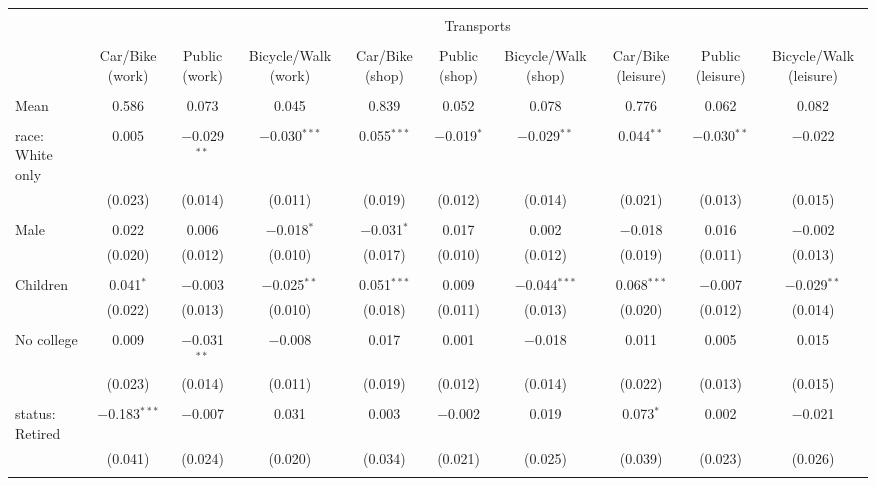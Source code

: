 
\begin{tabular}{@{\extracolsep{5pt}}lccccccccc} 
\\[-1.8ex]\hline 
\hline \\[-1.8ex] 
 & \multicolumn{9}{c}{Transports} \\ 
\cline{2-10} 
\\[-1.8ex] & Car/Bike (work) & Public (work) & Bicycle/Walk (work) & Car/Bike (shop) & Public (shop) & Bicycle/Walk (shop) & Car/Bike (leisure) & Public (leisure) & Bicycle/Walk (leisure) \\ 
\hline \\[-1.8ex] 
 Mean & 0.586 & 0.073 & 0.045 & 0.839 & 0.052 & 0.078 & 0.776 & 0.062 & 0.082  \\ \hline \\[-1.8ex] race: White only & 0.005 & $-$0.029$^{**}$ & $-$0.030$^{***}$ & 0.055$^{***}$ & $-$0.019$^{*}$ & $-$0.029$^{**}$ & 0.044$^{**}$ & $-$0.030$^{**}$ & $-$0.022 \\ 
  & (0.023) & (0.014) & (0.011) & (0.019) & (0.012) & (0.014) & (0.021) & (0.013) & (0.015) \\ 
  & & & & & & & & & \\ 
 Male & 0.022 & 0.006 & $-$0.018$^{*}$ & $-$0.031$^{*}$ & 0.017 & 0.002 & $-$0.018 & 0.016 & $-$0.002 \\ 
  & (0.020) & (0.012) & (0.010) & (0.017) & (0.010) & (0.012) & (0.019) & (0.011) & (0.013) \\ 
  & & & & & & & & & \\ 
 Children & 0.041$^{*}$ & $-$0.003 & $-$0.025$^{**}$ & 0.051$^{***}$ & 0.009 & $-$0.044$^{***}$ & 0.068$^{***}$ & $-$0.007 & $-$0.029$^{**}$ \\ 
  & (0.022) & (0.013) & (0.010) & (0.018) & (0.011) & (0.013) & (0.020) & (0.012) & (0.014) \\ 
  & & & & & & & & & \\ 
 No college & 0.009 & $-$0.031$^{**}$ & $-$0.008 & 0.017 & 0.001 & $-$0.018 & 0.011 & 0.005 & 0.015 \\ 
  & (0.023) & (0.014) & (0.011) & (0.019) & (0.012) & (0.014) & (0.022) & (0.013) & (0.015) \\ 
  & & & & & & & & & \\ 
 status: Retired & $-$0.183$^{***}$ & $-$0.007 & 0.031 & 0.003 & $-$0.002 & 0.019 & 0.073$^{*}$ & 0.002 & $-$0.021 \\ 
  & (0.041) & (0.024) & (0.020) & (0.034) & (0.021) & (0.025) & (0.039) & (0.023) & (0.026) \\ 
  & & & & & & & & & \\ 

\end{tabular}
